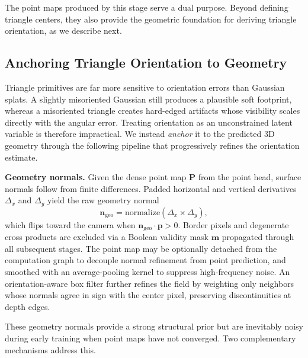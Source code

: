 \documentclass{llmxive}
\providecommand{\boldstart}[1]{\vspace{0.1in}\noindent\textbf{#1}}
\begin{document}
The point maps produced by this stage serve a dual purpose. Beyond defining triangle centers, they also provide the geometric foundation for deriving triangle orientation, as we describe next.

\subsection{Anchoring Triangle Orientation to Geometry}
\label{sec:normal_pipeline}

Triangle primitives are far more sensitive to orientation errors than Gaussian splats. A slightly misoriented Gaussian still produces a plausible soft footprint, whereas a misoriented triangle creates hard-edged artifacts whose visibility scales directly with the angular error. Treating orientation as an unconstrained latent variable is therefore impractical. We instead \emph{anchor} it to the predicted 3D geometry through the following 
pipeline that progressively refines the orientation estimate.

\boldstart{Geometry normals.}
Given the dense point map $\mathbf{P}$ from the point head, surface normals follow from finite differences. Padded horizontal and vertical derivatives $\Delta_x$ and $\Delta_y$ yield the raw geometry normal
\begin{equation}
    \mathbf{n}_{\mathrm{geo}} = \mathrm{normalize}(\Delta_x \times \Delta_y),
    \label{eq:geo_normal}
\end{equation}
which flips toward the camera when $\mathbf{n}_{\mathrm{geo}} \cdot \mathbf{p} > 0$. Border pixels and degenerate cross products are excluded via a Boolean validity mask $\mathbf{m}$ propagated through all subsequent stages. The point map may be optionally detached from the computation graph to decouple normal refinement from point prediction, and smoothed with an average-pooling kernel to suppress high-frequency noise. An orientation-aware box filter further refines the field by weighting only neighbors whose normals agree in sign with the center pixel, preserving discontinuities at depth edges.

These geometry normals provide a strong structural prior but are inevitably noisy during early training when point maps have not converged. Two complementary mechanisms address this.
\end{document}
